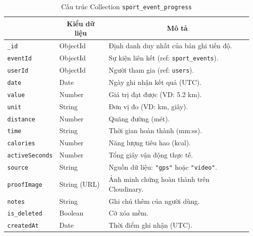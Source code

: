\begin{table}[H]
\centering
\footnotesize
\setlength{\tabcolsep}{5pt}
\renewcommand{\arraystretch}{1.15}
\begin{tabularx}{\textwidth}{|p{3.6cm}|p{2.6cm}|X|}
\hline
\rowcolor{dbheadblue}
\multicolumn{1}{|c|}{\color{white}\textbf{Trường}} &
\multicolumn{1}{c|}{\color{white}\textbf{Kiểu dữ liệu}} &
\multicolumn{1}{c|}{\color{white}\textbf{Mô tả}} \\
\hline
\texttt{\_id}           & ObjectId     & Định danh duy nhất của bản ghi tiến độ. \\ \hline
\rowcolor{dbrowalt}
\texttt{eventId}       & ObjectId     & Sự kiện liên kết (ref: \texttt{sport\_events}). \\ \hline
\texttt{userId}        & ObjectId     & Người tham gia (ref: \texttt{users}). \\ \hline
\rowcolor{dbrowalt}
\texttt{date}          & Date         & Ngày ghi nhận kết quả (UTC). \\ \hline
\texttt{value}         & Number       & Giá trị đạt được (VD: 5.2 km). \\ \hline
\rowcolor{dbrowalt}
\texttt{unit}          & String       & Đơn vị đo (VD: km, giây). \\ \hline
\texttt{distance}      & Number       & Quãng đường (mét). \\ \hline
\rowcolor{dbrowalt}
\texttt{time}          & String       & Thời gian hoàn thành (mm:ss). \\ \hline
\texttt{calories}      & Number       & Năng lượng tiêu hao (kcal). \\ \hline
\rowcolor{dbrowalt}
\texttt{activeSeconds} & Number       & Tổng giây vận động thực tế. \\ \hline
\texttt{source}        & String       & Nguồn dữ liệu: \texttt{"gps"} hoặc \texttt{"video"}. \\ \hline
\rowcolor{dbrowalt}
\texttt{proofImage}    & String (URL) & Ảnh minh chứng hoàn thành trên Cloudinary. \\ \hline
\texttt{notes}         & String       & Ghi chú thêm của người dùng. \\ \hline
\rowcolor{dbrowalt}
\texttt{is\_deleted}    & Boolean      & Cờ xóa mềm. \\ \hline
\texttt{createdAt}     & Date         & Thời điểm ghi nhận (UTC). \\ \hline
\end{tabularx}
\caption{Cấu trúc Collection \texttt{sport\_event\_progress}}
\label{tab:col_event_progress}
\end{table}

